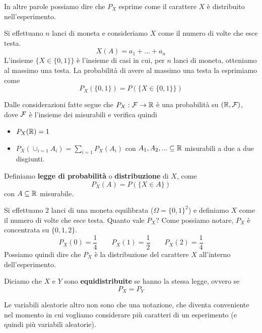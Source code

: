 In altre parole possiamo dire che $P_X$ esprime come il carattere $X$ è distribuito
nell'esperimento.

\begin{example}
	Si effettuano $n$ lanci di moneta e consideriamo $X$ come il numero di volte che esce testa.
	\[ X(A) = a_1 + \dots + a_n \]
	L'insieme $\{ X \in \{ 0, 1 \} \}$ è l'insieme di casi in cui, per $n$ lanci di moneta,
	otteniamo al massimo una testa. La probabilità di avere al massimo una testa
	la esprimiamo come
	\[ P_X (\{0,1\}) = P (\{X \in \{0,1\}\}) \]
\end{example}

\begin{proposition}
	Dalle considerazioni fatte segue che $P_X : \mathcal{F} \to \mathbb{R}$ è una probabilità su $(\mathbb{R}, \mathcal{F})$, dove
	$\mathcal{F}$ è l'insieme dei misurabili e verifica quindi
	\begin{itemize}
		\item $P_X (\mathbb{R}) = 1$
		\item $P_X(\cup_{i=1} A_i) = \sum_{i=1} P_X(A_i)$ con $A_1, A_2, ... \subseteq \mathbb{R}$
		      misurabili a due a due disgiunti.
	\end{itemize}
\end{proposition}

\begin{definition}
	Definiamo \textbf{legge di probabilità} o \textbf{distribuzione} di $X$, come
	\[ P_X (A) = P(\{ X \in A\}) \]
	con $A \subseteq \mathbb{R}$ misurabile.
\end{definition}

\begin{example}
	Si effettuano 2 lanci di una moneta equilibrata ($\Omega = \{ 0, 1 \}^2$) e definiamo $X$
	come il numero di volte che esce testa. Quanto vale $P_X$? Come possiamo notare, $P_X$ è
	concentrata su $\{ 0, 1, 2 \}$.
	\[
		P_X (0) = \frac{1}{4} \quad \quad
		P_X (1) = \frac{1}{2} \quad \quad
		P_X (2) = \frac{1}{4}
	\]
	Possiamo quindi dire che $P_X$ è la distribuzione del carattere $X$ all'interno
	dell'esperimento.
\end{example}

\begin{definition}
	Diciamo che $X$ e $Y$ sono \textbf{equidistribuite} se hanno la stessa legge, ovvero se
	\[ P_X = P_Y \]
\end{definition}

Le variabili aleatorie altro non sono che una notazione, che diventa conveniente nel momento in cui
vogliamo considerare più caratteri di un esperimento (e quindi più variabili aleatorie).

